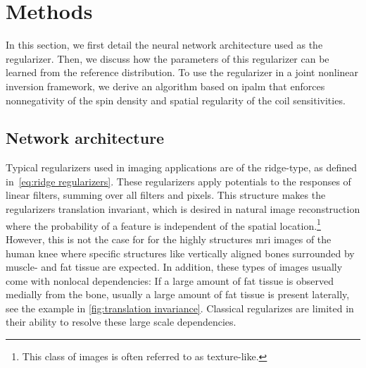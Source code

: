\section{Methods}%
\label{sec:methods}
In this section, we first detail the neural network architecture used as the regularizer.
Then, we discuss how the parameters of this regularizer can be learned from the reference distribution.
To use the regularizer in a joint nonlinear inversion framework, we derive an algorithm based on \gls{ipalm} that enforces nonnegativity of the spin density and spatial regularity of the coil sensitivities.
\subsection{Network architecture}%
\label{ssec:network architecture}
Typical regularizers used in imaging applications are of the ridge-type, as defined in~\cref{eq:ridge regularizers}.
These regularizers apply potentials to the responses of linear filters, summing over all filters and pixels.
This structure makes the regularizers translation invariant, which is desired in natural image reconstruction where the probability of a feature is independent of the spatial location.\footnote{This class of images is often referred to as texture-like.}
However, this is not the case for for the highly structures \gls{mri} images of the human knee where specific structures like vertically aligned bones surrounded by muscle- and fat tissue are expected.
In addition, these types of images usually come with nonlocal dependencies:
If a large amount of fat tissue is observed medially from the bone, usually a large amount of fat tissue is present laterally, see the example in \cref{fig:translation invariance}.
Classical regularizes are limited in their ability to resolve these large scale dependencies.

